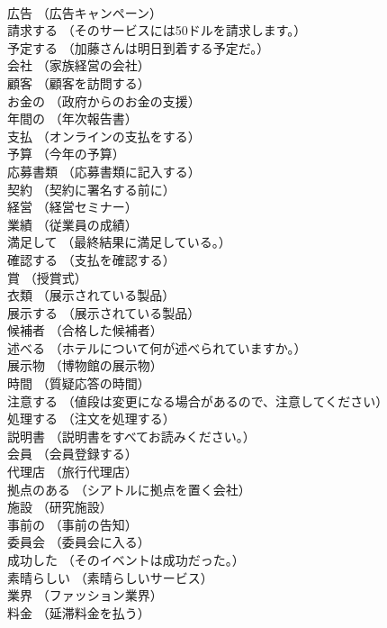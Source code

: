 \documentclass[8pt]{extreport}
\begin{document}
\begin{CJK}{UTF8}{min}
\\	広告	（広告キャンペーン）		
\\	請求する	（そのサービスには50ドルを請求します。）		
\\	予定する	（加藤さんは明日到着する予定だ。）		
\\	会社	（家族経営の会社）		
\\	顧客	（顧客を訪問する）		
\\	お金の	（政府からのお金の支援）		
\\	年間の	（年次報告書）		
\\	支払	（オンラインの支払をする）		
\\	予算	（今年の予算）		
\\	応募書類	（応募書類に記入する）		
\\	契約	（契約に署名する前に）		
\\	経営	（経営セミナー）		
\\	業績	（従業員の成績）		
\\	満足して	（最終結果に満足している。）		
\\	確認する	（支払を確認する）		
\\	賞	（授賞式）		
\\	衣類	（展示されている製品）		
\\	展示する	（展示されている製品）		
\\	候補者	（合格した候補者）		
\\	述べる	（ホテルについて何が述べられていますか。）		
\\	展示物	（博物館の展示物）		
\\	時間	（質疑応答の時間）		
\\	注意する	（値段は変更になる場合があるので、注意してください）		
\\	処理する	（注文を処理する）		
\\	説明書	（説明書をすべてお読みください。）		
\\	会員	（会員登録する）		
\\	代理店	（旅行代理店）		
\\	拠点のある	（シアトルに拠点を置く会社）		
\\	施設	（研究施設）		
\\	事前の	（事前の告知）		
\\	委員会	（委員会に入る）		
\\	成功した	（そのイベントは成功だった。）		
\\	素晴らしい	（素晴らしいサービス）		
\\	業界	（ファッション業界）		
\\	料金	（延滞料金を払う）		

\end{CJK}
\end{document}
